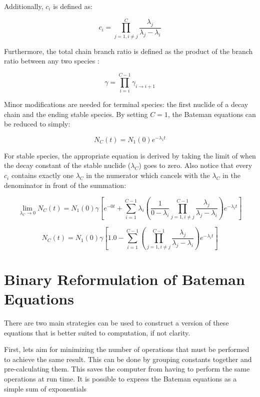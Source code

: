 \documentclass{anstrans}
\begin{document}
Additionally, $c_{i}$ is defined as:

\begin{equation}
\label{c_i}
c_i = \prod_{j=1,i\ne j}^C \frac{\lambda_j}{\lambda_j - \lambda_i}
\end{equation}

Furthermore, the total chain branch ratio is defined as the product of the 
branch ratio between any two species \cite{harr2007precise}:

\begin{equation}
\label{gamma}
\gamma = \prod_{i=i}^{C-1} \gamma_{i \to i+1}
\end{equation}

Minor modifications are needed for terminal species: the first nuclide of a 
decay chain and the ending stable species. By setting $C=1$, the Bateman
equations can be reduced to simply:

\begin{equation}
\label{N_C}
N_C(t) = N_1(0) e^{-\lambda_1 t}
\end{equation}

For stable species, the appropriate equation is derived by taking the limit
of when the decay constant of the stable nuclide ($\lambda_C$) goes to 
zero.  Also notice that every $c_i$ contains exactly one $\lambda_C$
in the numerator which cancels with the $\lambda_C$ in the denominator 
in front of the summation:

\begin{equation}
\label{lim_lam}
\lim_{\lambda_C \to 0} N_C(t) = N_1(0)  \gamma \left[e^{-0t} + \sum_{i=1}^{C-1} \lambda_i \left(\frac{1}{0 - \lambda_i} \prod_{j=1,i\ne j}^{C-1} \frac{\lambda_j}{\lambda_j - \lambda_i} \right) e^{-\lambda_i t} \right]
\end{equation}

\begin{equation}
\label{lim_lam_N_C}
N_C(t) = N_1(0)  \gamma \left[1.0 - \sum_{i=1}^{C-1} \left(\prod_{j=1,i\ne j}^{C-1} \frac{\lambda_j}{\lambda_j - \lambda_i} \right) e^{-\lambda_i t} \right]
\end{equation}


\section{Binary Reformulation of Bateman Equations}
There are two main strategies can be used to construct a version of these 
equations that is better suited to computation, if not clarity. 

First, lets aim for minimizing the number of 
operations that must be performed to achieve the same result. This can be done 
by grouping constants together and pre-calculating them. This saves the 
computer from having to perform the same operations at run time.  It is 
possible to express the Bateman equations as a simple sum of exponentials
\end{document}
